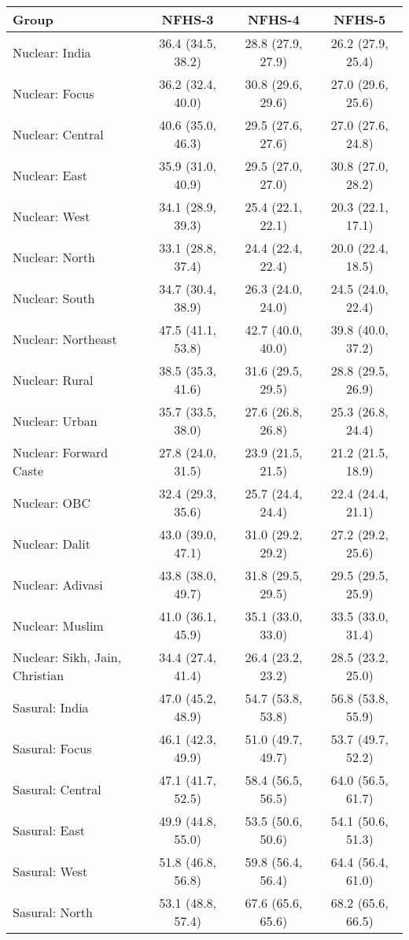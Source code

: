 \begin{tabular}{lccc}
\toprule
Group & NFHS-3 & NFHS-4 & NFHS-5 \\
\midrule
Nuclear: India&36.4 (34.5, 38.2)&28.8 (27.9, 27.9)&26.2 (27.9, 25.4)\\
Nuclear: Focus&36.2 (32.4, 40.0)&30.8 (29.6, 29.6)&27.0 (29.6, 25.6)\\
Nuclear: Central&40.6 (35.0, 46.3)&29.5 (27.6, 27.6)&27.0 (27.6, 24.8)\\
Nuclear: East&35.9 (31.0, 40.9)&29.5 (27.0, 27.0)&30.8 (27.0, 28.2)\\
Nuclear: West&34.1 (28.9, 39.3)&25.4 (22.1, 22.1)&20.3 (22.1, 17.1)\\
Nuclear: North&33.1 (28.8, 37.4)&24.4 (22.4, 22.4)&20.0 (22.4, 18.5)\\
Nuclear: South&34.7 (30.4, 38.9)&26.3 (24.0, 24.0)&24.5 (24.0, 22.4)\\
Nuclear: Northeast&47.5 (41.1, 53.8)&42.7 (40.0, 40.0)&39.8 (40.0, 37.2)\\
Nuclear: Rural&38.5 (35.3, 41.6)&31.6 (29.5, 29.5)&28.8 (29.5, 26.9)\\
Nuclear: Urban&35.7 (33.5, 38.0)&27.6 (26.8, 26.8)&25.3 (26.8, 24.4)\\
Nuclear: Forward Caste&27.8 (24.0, 31.5)&23.9 (21.5, 21.5)&21.2 (21.5, 18.9)\\
Nuclear: OBC&32.4 (29.3, 35.6)&25.7 (24.4, 24.4)&22.4 (24.4, 21.1)\\
Nuclear: Dalit&43.0 (39.0, 47.1)&31.0 (29.2, 29.2)&27.2 (29.2, 25.6)\\
Nuclear: Adivasi&43.8 (38.0, 49.7)&31.8 (29.5, 29.5)&29.5 (29.5, 25.9)\\
Nuclear: Muslim&41.0 (36.1, 45.9)&35.1 (33.0, 33.0)&33.5 (33.0, 31.4)\\
Nuclear: Sikh, Jain, Christian&34.4 (27.4, 41.4)&26.4 (23.2, 23.2)&28.5 (23.2, 25.0)\\
Sasural: India&47.0 (45.2, 48.9)&54.7 (53.8, 53.8)&56.8 (53.8, 55.9)\\
Sasural: Focus&46.1 (42.3, 49.9)&51.0 (49.7, 49.7)&53.7 (49.7, 52.2)\\
Sasural: Central&47.1 (41.7, 52.5)&58.4 (56.5, 56.5)&64.0 (56.5, 61.7)\\
Sasural: East&49.9 (44.8, 55.0)&53.5 (50.6, 50.6)&54.1 (50.6, 51.3)\\
Sasural: West&51.8 (46.8, 56.8)&59.8 (56.4, 56.4)&64.4 (56.4, 61.0)\\
Sasural: North&53.1 (48.8, 57.4)&67.6 (65.6, 65.6)&68.2 (65.6, 66.5)\\

\end{tabular}
